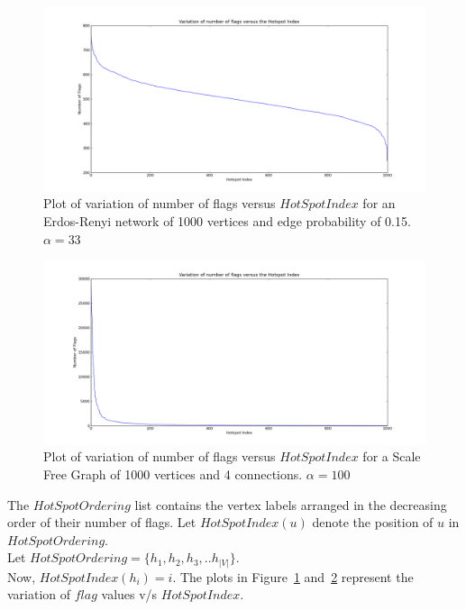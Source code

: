 \documentclass[10pt, conference, compsocconf]{IEEEtran}
\begin{document}
\begin{figure}[h]
\centering
\includegraphics[scale=0.2]{Results/ErdosRenyi100015cutpoint33.png}
\caption{Plot of variation of number of flags versus $HotSpotIndex$ 
for an Erdos-Renyi network of 1000 vertices and edge probability of 0.15.
\newline
$\alpha = 33$}
\label{4_optimum_er}
\end{figure}

\begin{figure}[h]
\centering
\includegraphics[scale=0.2]{Results/scalefreenetworks10004cutpoint100.png}
\caption{Plot of variation of number of flags versus $HotSpotIndex$ for 
a Scale Free Graph of 1000 vertices and 4 connections.
\newline
$\alpha = 100$}
\label{4_optimum_ba}
\end{figure}

The $HotSpotOrdering$ list contains the vertex labels arranged in the 
decreasing order of their number of flags. Let $HotSpotIndex(u)$
denote the position of $u$ in $HotSpotOrdering$.\\
Let $HotSpotOrdering = \{h_1, h_2, h_3,.. h_{|V|}\}$.\\
Now, $HotSpotIndex(h_i)=i$. The plots in Figure~\ref{4_optimum_er} and~\ref{4_optimum_ba} represent the variation of $flag$ values v/s $HotSpotIndex$.\\
\end{document}
